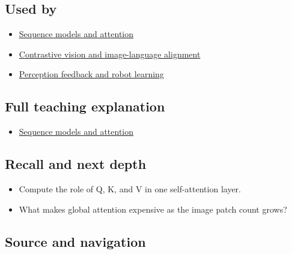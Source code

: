 \subsection{Used by}\label{used-by}

\begin{itemize}
\tightlist
\item
  \href{Continuous\%20Notes/University\%20-\%20Worlds,\%20Images\%20and\%20Inference\%20-\%20Graphics,\%20Vision\%20and\%20Photography\#Sequence\%20models\%20and\%20attention}{Sequence models and attention}
\item
  \hyperref[appendix-772f1fd96148]{Contrastive vision and image-language alignment}
\item
  \hyperref[appendix-b0c42da325f1]{Perception feedback and robot learning}
\end{itemize}

\subsection{Full teaching explanation}\label{full-teaching-explanation}

\begin{itemize}
\tightlist
\item
  \href{Continuous\%20Notes/University\%20-\%20Worlds,\%20Images\%20and\%20Inference\%20-\%20Graphics,\%20Vision\%20and\%20Photography\#Sequence\%20models\%20and\%20attention}{Sequence models and attention}
\end{itemize}

\subsection{Recall and next depth}\label{recall-and-next-depth}

\begin{itemize}
\tightlist
\item
  Compute the role of Q, K, and V in one self-attention layer.
\item
  What makes global attention expensive as the image patch count grows?
\end{itemize}

\subsection{Source and navigation}\label{source-and-navigation}

